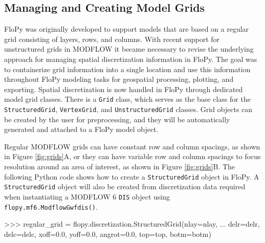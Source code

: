 \documentclass[11pt, oneside]{article}  	%
\begin{document}
\subsection{Managing and Creating Model Grids}

FloPy was originally developed to support models that are based on a regular grid consisting of layers, rows, and columns. With recent support for unstructured grids in MODFLOW \citep{modflowusg, modflow6gwf} it became necessary to revise the underlying approach for managing spatial discretization information in FloPy. The goal was to containerize grid information into a single location and use this information throughout FloPy modeling tasks for geospatial processing, plotting, and exporting. Spatial discretization is now handled in FloPy through dedicated model grid classes. There is a \texttt{Grid} class, which serves as the base class for the \texttt{StructuredGrid}, \texttt{VertexGrid}, and \texttt{UnstructuredGrid} classes. Grid objects can be created by the user for preprocessing, and they will be automatically generated and attached to a FloPy model object.

Regular MODFLOW grids can have constant row and column spacings, as shown in Figure \ref{fig:grids}A, or they can have variable row and column spacings to focus resolution around an area of interest, as shown in Figure \ref{fig:grids}B. The following Python code shows how to create a \texttt{StructuredGrid} object in FloPy. A \texttt{StructuredGrid} object will also be created from discretization data required when instantiating a MODFLOW 6 \texttt{DIS} object using \texttt{flopy.mf6.ModflowGwfdis()}. 

\begin{python}
>>> regular_grid = flopy.discretization.StructuredGrid(nlay=nlay, 
... delr=delr, delc=delc, xoff=0.0, yoff=0.0, angrot=0.0, top=top, botm=botm)
\end{python}
\end{document}
